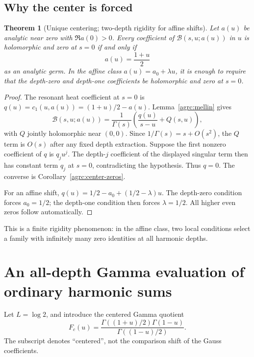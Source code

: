\documentclass[11pt]{article}
\numberwithin{equation}{section}
\newtheorem{theorem}{Theorem}[section]
\theoremstyle{definition}\newtheorem{definition}[theorem]{Definition}
\theoremstyle{remark}\newtheorem{remark}[theorem]{Remark}
\newcommand{\Bcal}{\mathcal B}
\begin{document}
\subsection{Why the center is forced}

\begin{theorem}[Unique centering; two-depth rigidity for affine shifts]
\label{agrc:unique-center}
Let $a(u)$ be analytic near zero with $\Re a(0)>0$.
Every coefficient of $\Bcal(s,u;a(u))$ in $u$ is holomorphic and zero at
$s=0$ if and only if
\begin{equation}\label{agrc:unique-shift}
 a(u)=\frac{1+u}{2}
\end{equation}
as an analytic germ. In the affine class $a(u)=a_0+\lambda u$, it is
enough to require that the depth-zero and depth-one coefficients be
holomorphic and zero at $s=0$.
\end{theorem}
\begin{proof}
The resonant heat coefficient at $s=0$ is
$q(u)=c_1(u,a(u))=(1+u)/2-a(u)$. Lemma~\ref{agrc:mellin} gives
\[
 \Bcal(s,u;a(u))=\frac1{\Gamma(s)}\left(\frac{q(u)}{s-u}+Q(s,u)\right),
\]
with $Q$ jointly holomorphic near $(0,0)$. Since
$1/\Gamma(s)=s+O(s^2)$, the $Q$ term is $O(s)$ after any fixed depth
extraction. Suppose the first nonzero coefficient of $q$ is $q_j u^j$.
The depth-$j$ coefficient of the displayed singular term then has
constant term $q_j$ at $s=0$, contradicting the hypothesis. Thus $q=0$.
The converse is Corollary~\ref{agrc:center-zeros}.

For an affine shift,
$q(u)=1/2-a_0+(1/2-\lambda)u$. The depth-zero condition forces
$a_0=1/2$; the depth-one condition then forces $\lambda=1/2$.
All higher even zeros follow automatically.
\end{proof}

This is a finite rigidity phenomenon: in the affine class, two local
conditions select a family with infinitely many zero identities at
all harmonic depths.

\section{An all-depth Gamma evaluation of ordinary harmonic sums}
\label{agrc:ordinary-sums}

Let $L=\log2$, and introduce the centered Gamma quotient
\begin{equation}\label{agrc:Fc}
 F_c(u)=\frac{\Gamma((1+u)/2)\Gamma(1-u)}{\Gamma((1-u)/2)}.
\end{equation}
The subscript denotes ``centered'', not the comparison shift of the
Gauss coefficients.
\end{document}
